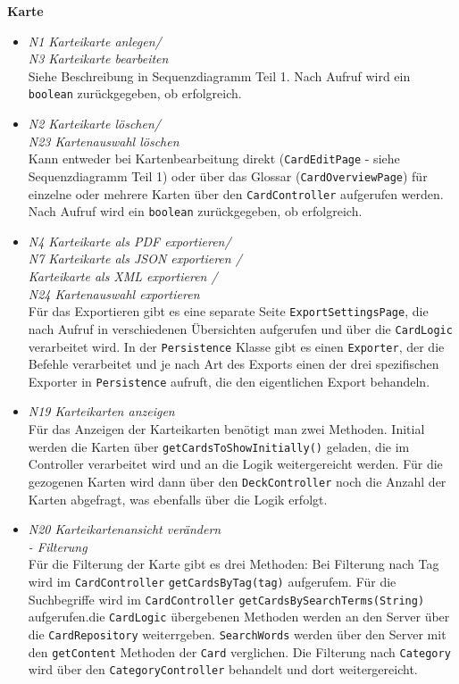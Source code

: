 \documentclass[fontsize=12pt,paper=A4,twoside]{scrartcl}
\begin{document}
    \textbf{\large Karte}
    \begin{itemize}
    \item \textit{N1 Karteikarte anlegen/\\ N3 Karteikarte bearbeiten}\\ 
    Siehe Beschreibung in Sequenzdiagramm Teil 1. Nach Aufruf wird ein \texttt{boolean} zurückgegeben, ob erfolgreich.
    \item \textit{N2 Karteikarte löschen/\\ N23 Kartenauswahl löschen}\\ 
    Kann entweder bei Kartenbearbeitung direkt (\texttt{CardEditPage} - siehe Sequenzdiagramm Teil 1) oder über das Glossar (\texttt{CardOverviewPage}) 
    für einzelne oder mehrere Karten über den \texttt{CardController} aufgerufen werden. Nach Aufruf wird ein \texttt{boolean} zurückgegeben, ob erfolgreich.
    \item \textit{N4 Karteikarte als PDF exportieren/\\ 
    N7 Karteikarte als JSON exportieren /\\
    Karteikarte als XML exportieren /\\
    N24 Kartenauswahl exportieren}\\ 
    Für das Exportieren gibt es eine separate Seite \texttt{ExportSettingsPage}, die nach Aufruf 
    in verschiedenen Übersichten aufgerufen und über die \texttt{CardLogic} verarbeitet wird. In der \texttt{Persistence} Klasse gibt es einen \texttt{Exporter}, der die Befehle 
    verarbeitet und je nach Art des Exports einen der drei spezifischen Exporter in \texttt{Persistence} aufruft, die den eigentlichen Export behandeln.
    \item \textit{N19 Karteikarten anzeigen}\\ Für das Anzeigen der Karteikarten benötigt man zwei Methoden. Initial werden die
    Karten über \texttt{getCardsToShowInitially()} geladen, die im Controller verarbeitet wird und an die Logik weitergereicht werden. Für die gezogenen Karten wird
    dann über den \texttt{DeckController} noch die Anzahl der Karten abgefragt, was ebenfalls über die Logik erfolgt.
    \item \textit{N20 Karteikartenansicht verändern\\- Filterung}\\ 
    Für die Filterung der Karte gibt es drei Methoden: Bei Filterung nach Tag wird im \texttt{CardController} \texttt{getCardsByTag(tag)} aufgerufem.
    Für die Suchbegriffe wird im \texttt{CardController} \texttt{getCardsBySearchTerms(String)} aufgerufen.die \texttt{CardLogic} übergebenen Methoden werden an den Server über die \texttt{CardRepository} weiterrgeben. \texttt{SearchWords} werden über 
    den Server mit den \texttt{getContent} Methoden der \texttt{Card} verglichen.
    Die Filterung nach \texttt{Category} wird über den \texttt{CategoryController} behandelt und dort weitergereicht.
    \end{itemize}
    \ 
\end{document}
